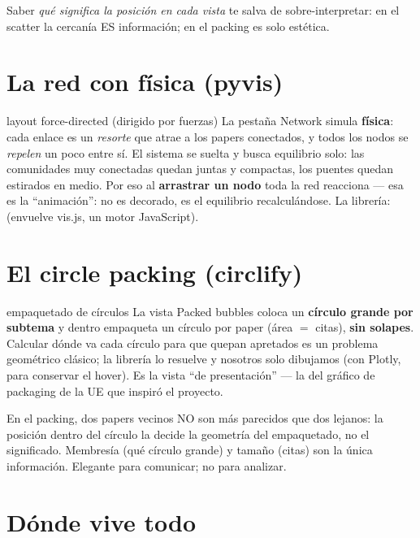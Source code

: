 \documentclass[11pt,a4paper]{article}
\begin{document}
Saber \emph{qué significa la posición en cada vista} te salva de sobre-interpretar: en el
scatter la cercanía ES información; en el packing es solo estética.

\section{La red con física (pyvis)}

\begin{concepto}{layout force-directed (dirigido por fuerzas)}
La pestaña Network simula \textbf{física}: cada enlace es un \emph{resorte} que atrae a los
papers conectados, y todos los nodos se \emph{repelen} un poco entre sí. El sistema se suelta
y busca equilibrio solo: las comunidades muy conectadas quedan juntas y compactas, los
puentes quedan estirados en medio. Por eso al \textbf{arrastrar un nodo} toda la red
reacciona — esa es la ``animación'': no es decorado, es el equilibrio recalculándose.
La librería:  (envuelve vis.js, un motor JavaScript).
\end{concepto}

\section{El circle packing (circlify)}

\begin{concepto}{empaquetado de círculos}
La vista Packed bubbles coloca un \textbf{círculo grande por subtema} y dentro empaqueta un
círculo por paper (área $=$ citas), \textbf{sin solapes}. Calcular dónde va cada círculo para
que quepan apretados es un problema geométrico clásico; la librería  lo
resuelve y nosotros solo dibujamos (con Plotly, para conservar el hover). Es la vista
``de presentación'' — la del gráfico de packaging de la UE que inspiró el proyecto.
\end{concepto}

\begin{ojo}
En el packing, dos papers vecinos NO son más parecidos que dos lejanos: la posición dentro
del círculo la decide la geometría del empaquetado, no el significado. Membresía (qué círculo
grande) y tamaño (citas) son la única información. Elegante para comunicar; no para analizar.
\end{ojo}

\section{Dónde vive todo}
\end{document}
